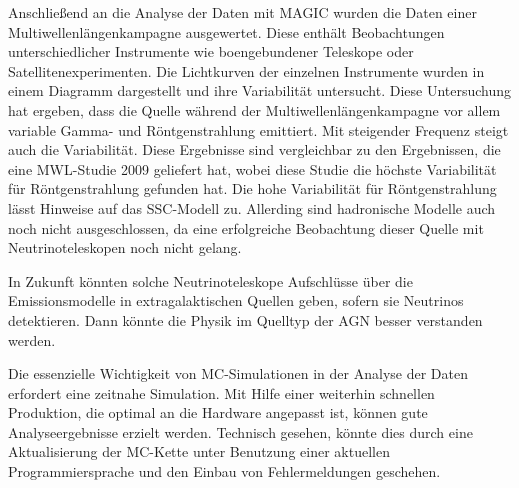 Anschließend an die Analyse der Daten mit MAGIC wurden die Daten einer Multiwellenlängenkampagne ausgewertet.
Diese enthält Beobachtungen unterschiedlicher Instrumente wie boengebundener Teleskope oder Satellitenexperimenten.
Die Lichtkurven der einzelnen Instrumente wurden in einem Diagramm dargestellt und ihre Variabilität untersucht.
Diese Untersuchung hat ergeben, dass die Quelle während der Multiwellenlängenkampagne vor allem variable Gamma- und Röntgenstrahlung emittiert.
Mit steigender Frequenz steigt auch die Variabilität.
Diese Ergebnisse sind vergleichbar zu den Ergebnissen, die eine MWL-Studie 2009 geliefert hat, wobei diese Studie die höchste Variabilität für Röntgenstrahlung gefunden hat.
Die hohe Variabilität für Röntgenstrahlung lässt Hinweise auf das SSC-Modell zu.
Allerding sind hadronische Modelle auch noch nicht ausgeschlossen, da eine erfolgreiche Beobachtung dieser Quelle mit Neutrinoteleskopen noch nicht gelang.

In Zukunft könnten solche Neutrinoteleskope Aufschlüsse über die Emissionsmodelle in extragalaktischen Quellen geben, sofern sie Neutrinos detektieren.
Dann könnte die Physik im Quelltyp der AGN besser verstanden werden.

Die essenzielle Wichtigkeit von MC-Simulationen in der Analyse der Daten erfordert eine zeitnahe Simulation.
Mit Hilfe einer weiterhin schnellen Produktion, die optimal an die Hardware angepasst ist, können gute Analyseergebnisse erzielt werden.
Technisch gesehen, könnte dies durch eine Aktualisierung der MC-Kette unter Benutzung einer aktuellen Programmiersprache und den Einbau von Fehlermeldungen geschehen.